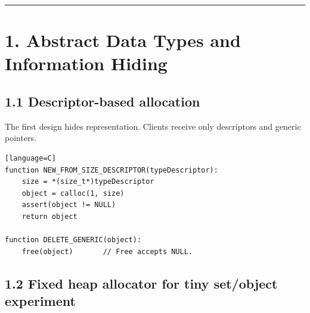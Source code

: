 \documentclass[11pt]{article}
\providecommand{\passthrough}[1]{#1}
\begin{document}

\begin{center}\rule{0.5\linewidth}{0.5pt}\end{center}

\section{1. Abstract Data Types and Information
Hiding}\label{abstract-data-types-and-information-hiding}

\subsection{1.1 Descriptor-based
allocation}\label{descriptor-based-allocation}

The first design hides representation. Clients receive only descriptors
and generic pointers.

\begin{verbatim}[language=C]
function NEW_FROM_SIZE_DESCRIPTOR(typeDescriptor):
    size = *(size_t*)typeDescriptor
    object = calloc(1, size)
    assert(object != NULL)
    return object

function DELETE_GENERIC(object):
    free(object)       // Free accepts NULL.
\end{verbatim}

\subsection{1.2 Fixed heap allocator for tiny set/object
experiment}\label{fixed-heap-allocator-for-tiny-setobject-experiment}
\end{document}
